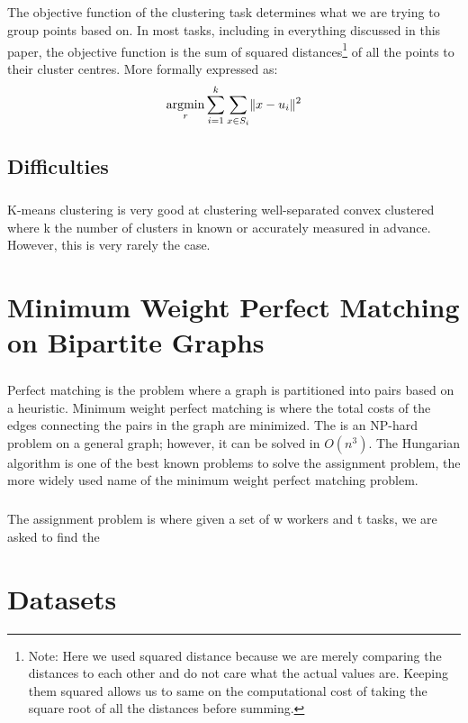 \documentclass[12pt]{dalthesis}
\DeclarePairedDelimiter\norm{\lVert}{\rVert}%
\DeclareMathOperator*{\argmin}{argmin}
\begin{document}
\paragraph{}
The objective function of the clustering task determines what we are trying to group points based on. In most tasks, including in everything discussed in this paper, the objective function is the sum of squared distances\footnote{Note: Here we used squared distance because we are merely comparing the distances to each other and do not care what the actual values are. Keeping them squared allows us to same on the computational cost of taking the square root of all the distances before summing.}
of all the points to their cluster centres. More formally expressed as:
$$\argmin\limits_r\sum_{i=1}^{k}\sum_{x\in S_i}\norm{ x-u_i}^2$$


\section{Difficulties}
\paragraph{}
K-means clustering is very good at clustering well-separated convex clustered where k the number of clusters in known or accurately measured in advance. However, this is very rarely the case.
\chapter{Minimum Weight Perfect Matching on Bipartite Graphs}
\paragraph{}
Perfect matching is the problem where a graph is partitioned into pairs based on a heuristic. Minimum weight perfect matching is where the total costs of the edges connecting the pairs in the graph are minimized. The is an NP-hard problem on a general graph; however, it can be solved in $O(n^3)$. The Hungarian algorithm is one of the best known problems to solve the assignment problem, the more widely used name of the minimum weight perfect matching problem.
\paragraph{}
The assignment problem is where given a set of w workers and t tasks, we are asked to find the

\chapter{Datasets}
\end{document}
